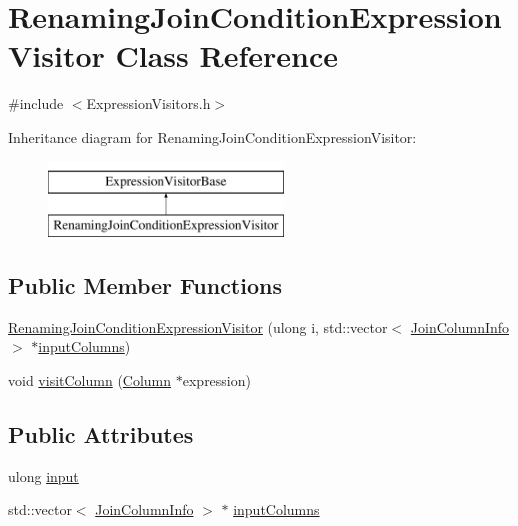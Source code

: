 \hypertarget{class_renaming_join_condition_expression_visitor}{\section{Renaming\+Join\+Condition\+Expression\+Visitor Class Reference}
\label{class_renaming_join_condition_expression_visitor}
}


{\ttfamily \#include $<$Expression\+Visitors.\+h$>$}

Inheritance diagram for Renaming\+Join\+Condition\+Expression\+Visitor\+:\begin{figure}[H]
\begin{center}
\leavevmode
\includegraphics[height=2.000000cm]{class_renaming_join_condition_expression_visitor}
\end{center}
\end{figure}
\subsection*{Public Member Functions}
\begin{DoxyCompactItemize}
\item 
\hyperlink{class_renaming_join_condition_expression_visitor_a2b0669f3664fd3b9170e431bfcde9851}{Renaming\+Join\+Condition\+Expression\+Visitor} (ulong i, std\+::vector$<$ \hyperlink{class_join_column_info}{Join\+Column\+Info} $>$ $\ast$\hyperlink{class_renaming_join_condition_expression_visitor_a8b8dceeedbf7c4d3aac3761ce3a4c302}{input\+Columns})
\item 
void \hyperlink{class_renaming_join_condition_expression_visitor_aa55184f591960115d4e11eff4be0d3d5}{visit\+Column} (\hyperlink{class_column}{Column} $\ast$expression)
\end{DoxyCompactItemize}
\subsection*{Public Attributes}
\begin{DoxyCompactItemize}
\item 
ulong \hyperlink{class_renaming_join_condition_expression_visitor_a8ce65701767eb8d0e6e96eeee49276ea}{input}
\item 
std\+::vector$<$ \hyperlink{class_join_column_info}{Join\+Column\+Info} $>$ $\ast$ \hyperlink{class_renaming_join_condition_expression_visitor_a8b8dceeedbf7c4d3aac3761ce3a4c302}{input\+Columns}
\end{DoxyCompactItemize}


